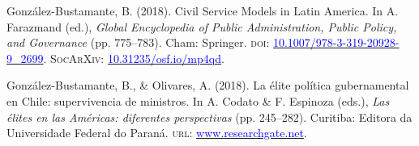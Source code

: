 \begin{publications}

\begin{benumerate}{12}

\item{\small González-Bustamante, B. (2018). Civil Service Models in Latin America. In A. Farazmand (ed.), {\itshape Global Encyclopedia of Public Administration, Public Policy, and Governance} (pp. 775--783). Cham: Springer. {\scshape doi:} \href{https://doi.org/10.1007/978-3-319-20928-9\_2699}{\textcolor{blue}{10.1007/978-3-319-20928-9\_2699}}. {\scshape \footnotesize SocArXiv:} \href{https://doi.org/10.31235/osf.io/mp4qd}{\textcolor{blue}{10.31235/osf.io/mp4qd}}.}\vspace{1mm}


\item{\small González-Bustamante, B., \& Olivares, A. (2018). La élite política gubernamental en Chile: supervivencia de ministros. In A. Codato \& F. Espinoza (eds.), {\itshape Las élites en las Américas: diferentes perspectivas} (pp. 245--282). Curitiba: Editora da Universidade Federal do Paraná. {\scshape url:} \href{https://www.researchgate.net/publication/325699783_Elites_en_las_Americas_diferentes_perspectivas_Elites_in_the_Americas_Different_Perspectives}{\textcolor{blue}{www.researchgate.net}}.}\vspace{1mm}



\end{benumerate}
\end{publications}
